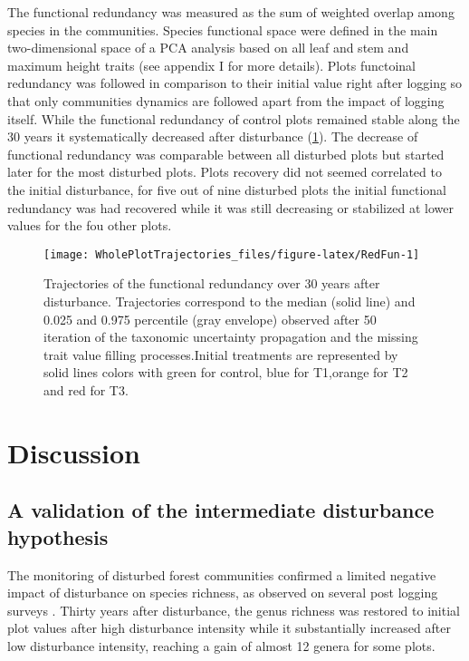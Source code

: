 \documentclass[fleqn,10pt]{ArtEcoFoG} %
\theoremstyle{definition}
\theoremstyle{definition}
\theoremstyle{definition}
\theoremstyle{remark}
\begin{document}
The functional redundancy was measured as the sum of weighted overlap
among species in the communities. Species functional space were defined
in the main two-dimensional space of a PCA analysis based on all leaf
and stem and maximum height traits (see appendix I for more details).
Plots functoinal redundancy was followed in comparison to their initial
value right after logging so that only communities dynamics are followed
apart from the impact of logging itself. While the functional redundancy
of control plots remained stable along the 30 years it systematically
decreased after disturbance (\ref{fig:RedFun}). The decrease of
functional redundancy was comparable between all disturbed plots but
started later for the most disturbed plots. Plots recovery did not
seemed correlated to the initial disturbance, for five out of nine
disturbed plots the initial functional redundancy was had recovered
while it was still decreasing or stabilized at lower values for the fou
other plots.

\begin{figure}

{\centering \texttt{[image: WholePlotTrajectories\_files/figure-latex/RedFun-1]} 

}

\caption{Trajectories of the functional redundancy over 30 years after disturbance. Trajectories correspond to the median (solid line) and 0.025 and 0.975 percentile (gray envelope) observed after 50 iteration of the taxonomic uncertainty propagation and the missing trait value filling processes.Initial treatments are represented by solid lines colors with green for control, blue for T1,orange for T2 and red for T3.}\label{fig:RedFun}
\end{figure}

\section{Discussion}\label{discussion}

\subsection{A validation of the intermediate disturbance
hypothesis}\label{a-validation-of-the-intermediate-disturbance-hypothesis}

The monitoring of disturbed forest communities confirmed a limited
negative impact of disturbance on species richness, as observed on
several post logging surveys \citep{Cannon1998, Baraloto2012a}. Thirty
years after disturbance, the genus richness was restored to initial plot
values after high disturbance intensity while it substantially increased
after low disturbance intensity, reaching a gain of almost 12 genera for
some plots.
\end{document}
